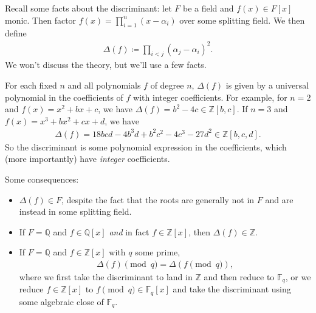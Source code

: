 \begin{remark}

Recall some facts about the discriminant: let \(F\) be a field and
\(f(x) \in F[x]\) monic. Then factor
\(f(x) = \prod_{i=1}^n (x - \alpha_i)\) over some splitting field. We
then define
\begin{align*}
{\Delta}(f) \coloneqq\prod_{i < j} ( \alpha_j - \alpha_i )^2
.\end{align*}
We won't discuss the theory, but we'll use a few facts.

\end{remark}

\begin{fact}

For each fixed \(n\) and all polynomials \(f\) of degree \(n\),
\({\Delta}(f)\) is given by a universal polynomial in the coefficients
of \(f\) with integer coefficients. For example, for \(n=2\) and
\(f(x) = x^2 + bx + c\), we have
\({\Delta}(f) = b^2 - 4c \in {\mathbb{Z}}[b,c]\). If \(n=3\) and
\(f(x) = x^3 + bx^2 + cx + d\), we have
\begin{align*}
{\Delta}(f) = 18bcd - 4b^3d + b^2c^2 - 4c^3 - 27d^2\in {\mathbb{Z}}[b,c,d]
.\end{align*}
So the discriminant is some polynomial expression in the coefficients,
which (more importantly) have \emph{integer} coefficients.

Some consequences:

\begin{itemize}
\tightlist
\item
  \({\Delta}(f) \in F\), despite the fact that the roots are generally
  not in \(F\) and are instead in some splitting field.
\item
  If \(F ={\mathbb{Q}}\) and \(f\in {\mathbb{Q}}[x]\) \emph{and} in fact
  \(f\in {\mathbb{Z}}[x]\), then \({\Delta}(f) \in {\mathbb{Z}}\).
\item
  If \(F = {\mathbb{Q}}\) and \(f\in {\mathbb{Z}}[x]\) with \(q\) some
  prime,
  \begin{align*}
  {\Delta}( f) \pmod q = {\Delta}(f \pmod q)
  ,\end{align*}
  where we first take the discriminant to land in \({\mathbb{Z}}\) and
  then reduce to \({\mathbb{F}}_q\), or we reduce
  \(f\in {\mathbb{Z}}[x]\) to \(f\pmod q \in {\mathbb{F}}_q[x]\) and
  take the discriminant using some algebraic close of
  \({\mathbb{F}}_q\).
\end{itemize}

\end{fact}

